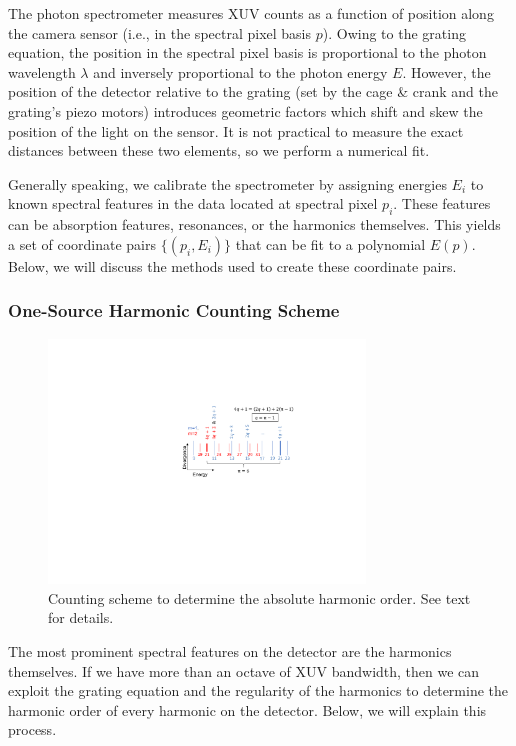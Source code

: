 The photon spectrometer measures XUV counts as a function of position along the camera sensor (i.e., in the spectral pixel basis $p$). Owing to the grating equation, the position in the spectral pixel basis is proportional to the photon wavelength $\lambda$ and inversely proportional to the photon energy $E$. However, the position of the detector relative to the grating (set by the cage \& crank and the grating's piezo motors) introduces geometric factors which shift and skew the position of the light on the sensor. It is not practical to measure the exact distances between these two elements, so we perform a numerical fit.

Generally speaking, we calibrate the spectrometer by assigning energies $E_i$ to known spectral features in the data located at spectral pixel $p_i$. These features can be absorption features, resonances, or the harmonics themselves. This yields a set of coordinate pairs $\{(p_i,E_i)\}$ that can be fit to a polynomial $E(p)$. Below, we will discuss the methods used to create these coordinate pairs.

\subsubsection{One-Source Harmonic Counting Scheme}

\begin{figure}
	\centering
	\includegraphics[width=0.75\textwidth]{figures/chap2/harmonic_counting.pdf}
	\caption{Counting scheme to determine the absolute harmonic order. See text for details.}
	\label{fig:harmonic_counting}
\end{figure}

The most prominent spectral features on the detector are the harmonics themselves. If we have more than an octave of XUV bandwidth, then we can exploit the grating equation and the regularity of the harmonics to determine the harmonic order of every harmonic on the detector. Below, we will explain this process.

